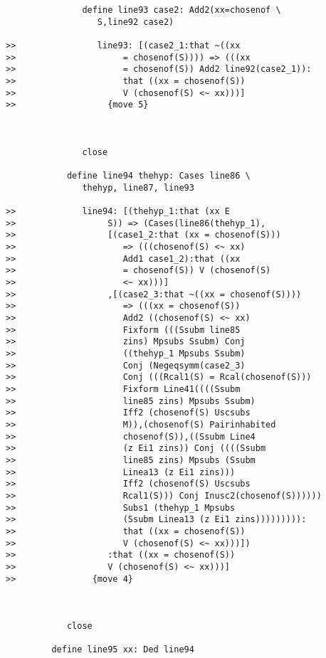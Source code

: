 \documentclass[12pt]{article}
\begin{document}
\begin{verbatim}
               define line93 case2: Add2(xx=chosenof \
                  S,line92 case2)

>>                line93: [(case2_1:that ~((xx
>>                     = chosenof(S)))) => (((xx
>>                     = chosenof(S)) Add2 line92(case2_1)):
>>                     that ((xx = chosenof(S))
>>                     V (chosenof(S) <~ xx)))]
>>                  {move 5}



               close

            define line94 thehyp: Cases line86 \
               thehyp, line87, line93

>>             line94: [(thehyp_1:that (xx E
>>                  S)) => (Cases(line86(thehyp_1),
>>                  [(case1_2:that (xx = chosenof(S)))
>>                     => (((chosenof(S) <~ xx)
>>                     Add1 case1_2):that ((xx
>>                     = chosenof(S)) V (chosenof(S)
>>                     <~ xx)))]
>>                  ,[(case2_3:that ~((xx = chosenof(S))))
>>                     => (((xx = chosenof(S))
>>                     Add2 ((chosenof(S) <~ xx)
>>                     Fixform (((Ssubm line85
>>                     zins) Mpsubs Ssubm) Conj
>>                     ((thehyp_1 Mpsubs Ssubm)
>>                     Conj (Negeqsymm(case2_3)
>>                     Conj (((Rcal1(S) = Rcal(chosenof(S)))
>>                     Fixform Line41((((Ssubm
>>                     line85 zins) Mpsubs Ssubm)
>>                     Iff2 (chosenof(S) Uscsubs
>>                     M)),(chosenof(S) Pairinhabited
>>                     chosenof(S)),((Ssubm Line4
>>                     (z Ei1 zins)) Conj ((((Ssubm
>>                     line85 zins) Mpsubs (Ssubm
>>                     Linea13 (z Ei1 zins)))
>>                     Iff2 (chosenof(S) Uscsubs
>>                     Rcal1(S))) Conj Inusc2(chosenof(S))))))
>>                     Subs1 (thehyp_1 Mpsubs
>>                     (Ssubm Linea13 (z Ei1 zins))))))))):
>>                     that ((xx = chosenof(S))
>>                     V (chosenof(S) <~ xx)))])
>>                  :that ((xx = chosenof(S))
>>                  V (chosenof(S) <~ xx)))]
>>               {move 4}



            close

         define line95 xx: Ded line94


\end{verbatim}
\end{document}
